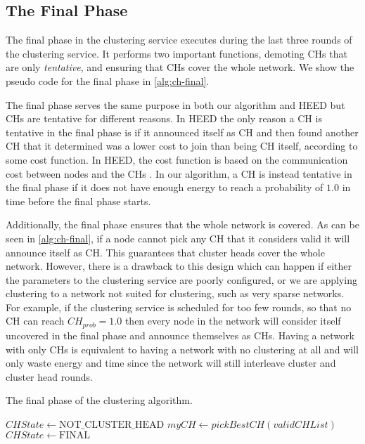 \subsection{The Final Phase}
\label{subsec:final-phase}
The final phase in the clustering service executes during the last three rounds of the clustering service. It performs two important functions, demoting CHs that are only \emph{tentative}, and ensuring that CHs cover the whole network. We show the pseudo code for the final phase in \cref{alg:ch-final}.

The final phase serves the same purpose in both our algorithm and HEED but CHs are tentative for different reasons. In HEED the only reason a CH is tentative in the final phase is if it announced itself as CH and then found another CH that it determined was a lower cost to join than being CH itself, according to some cost function. In HEED, the cost function is based on the communication cost between nodes and the CHs \cite{Younis2004-HEED}. In our algorithm, a CH is instead tentative in the final phase if it does not have enough energy to reach a probability of $1.0$ in time before the final phase starts. 

Additionally, the final phase ensures that the whole network is covered. As can be seen in \cref{alg:ch-final}, if a node cannot pick any CH that it considers valid it will announce itself as CH. This guarantees that cluster heads cover the whole network. However, there is a drawback to this design which can happen if either the parameters to the clustering service are poorly configured, or we are applying clustering to a network not suited for clustering, such as very sparse networks. For example, if the clustering service is scheduled for too few rounds, so that no CH can reach $CH_{prob} = 1.0$ then every node in the network will consider itself uncovered in the final phase and announce themselves as CHs. Having a network with only CHs is equivalent to having a network with no clustering at all and will only waste energy and time since the network will still interleave cluster and cluster head rounds.

\begin{algorithm}[bt]
\caption{The final phase of the clustering algorithm.}
\label{alg:ch-final}
\begin{algorithmic}[1]
            \State $CHState \gets \text{NOT\_CLUSTER\_HEAD}$
            \State $myCH \gets pickBestCH(validCHList)$
        \Else
            \State $CHState \gets \text{FINAL}$
        \EndIf
    \EndIf
\EndProcedure
\end{algorithmic}
\end{algorithm}


